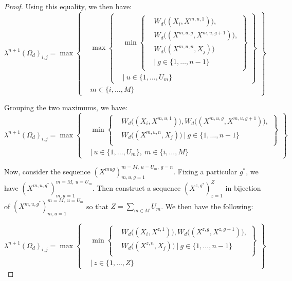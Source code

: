 \documentclass{article} %
\theoremstyle{style1}
\theoremstyle{style1}
\theoremstyle{example}
\begin{document}
\begin{proof}
Using this equality, we then have:
\[
\lambda^{n+1}(\Omega_d)_{i,j} =\max
\left\{
  \begin{aligned}
  &\max
          \left\{
          \begin{aligned}
            &\min\left\{
            \begin{aligned}
            &W_d\big((X_i,X^{m,u,1})\big), \\
            & W_d\big((X^{m,u,g},X^{m,u,g+1})\big), \\
            &W_d\big((X^{m,u,n},X_j)\big)\ \\
            &|\ g\in\{1,\ldots,n-1\}\\
            \end{aligned}
            \right\} \\
            &|\ u\in\{1,\ldots,U_m\}
          \end{aligned}
          \right\} \\
  & m\in\{i,\ldots,M\}
  \end{aligned}
\right\}
\]

Grouping the two maximums, we have:
\[
\lambda^{n+1}(\Omega_d)_{i,j} =\max
\left\{
  \begin{aligned}
            &\min\left\{
            \begin{aligned}
            &W_d\big((X_i,X^{m,u,1})\big), W_d\big((X^{m,u,g},X^{m,u,g+1})\big), \\
            &W_d\big((X^{m,u,n},X_j)\big)\ |\ g\in\{1,\ldots,n-1\}\\
            \end{aligned}
            \right\} \\
            &|\ u\in\{1,\ldots,U_m\},\ m\in\{i,\ldots,M\}
  \end{aligned}
\right\}
\]

Now, consider the sequence $(X^{mug})_{m,u,g=1}^{m=M,\ u=U_m,\ g=n}$. Fixing a particular $g^*$, we have $(X^{m,u,g^*})_{m,u=1}^{m=M,\ u=U_m}$. Then construct a sequence $(X^{z,g^*})_{z=1}^Z$ in bijection of $(X^{m,u,g^*})_{m,u=1}^{m=M,\ u=U_m}$ so that $Z=\sum_{m\in M}U_m$. We then have the following: 

\[
\lambda^{n+1}(\Omega_d)_{i,j} =\max
\left\{
  \begin{aligned}
            &\min\left\{
            \begin{aligned}
            &W_d\big((X_i,X^{z,1})\big), W_d\big((X^{z,g},X^{z,g+1})\big), \\
            &W_d\big((X^{z,n},X_j)\big)\ |\ g\in\{1,\ldots,n-1\}\\
            \end{aligned}
            \right\} \\
            &|\ z\in\{1,\ldots,Z\}
  \end{aligned}
\right\}
\]


\end{proof}
\end{document}
